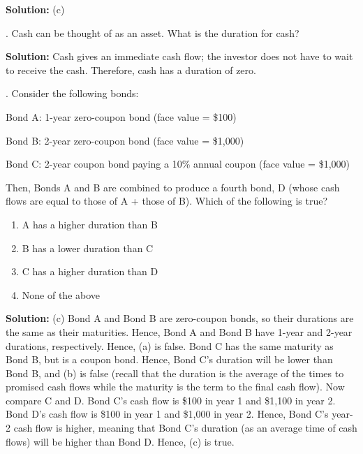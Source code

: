\documentclass[11.5pt]{article}
\begin{document}
\textbf{Solution:} (c)

\vspace{30pt}



. Cash can be thought of as an asset. What is the duration for cash?

\noindent \textbf{Solution:} Cash gives an immediate cash flow; the investor does not have to wait to receive the cash. Therefore, cash has a duration of zero.



\vspace{30pt}


\newpage


. Consider the following bonds:

Bond A: 1-year zero-coupon bond (face value = \$100)

Bond B: 2-year zero-coupon bond (face value = \$1,000)

Bond C: 2-year coupon bond paying a 10\% annual coupon (face value = \$1,000)

\noindent Then, Bonds A and B are combined to produce a fourth bond, D (whose cash flows are equal to those of A + those of B). Which of the following is true?


\begin{enumerate}[a]
	
	\item A has a higher duration than B
	
	\item B has a lower duration than C
	
	\item C has a higher duration than D
	
	\item None of the above
\end{enumerate}

\noindent \textbf{Solution:}  (c) Bond A and Bond B are zero-coupon bonds, so their durations are the same as their maturities. Hence, Bond A and Bond B have 1-year and 2-year durations, respectively. Hence, (a) is false. Bond C has the same maturity as Bond B, but is a coupon bond. Hence, Bond C’s duration will be lower than Bond B, and (b) is false (recall that the duration is the average of the times to promised cash flows while the maturity is the term to the final cash flow). Now compare C and D. Bond C’s cash flow is \$100 in year 1 and \$1,100 in year 2. Bond D’s cash flow is \$100 in year 1 and \$1,000 in year 2. Hence, Bond C’s year-2 cash flow is higher, meaning that Bond C’s duration (as an average time of cash flows) will be higher than Bond D. Hence, (c) is true.
\end{document}
